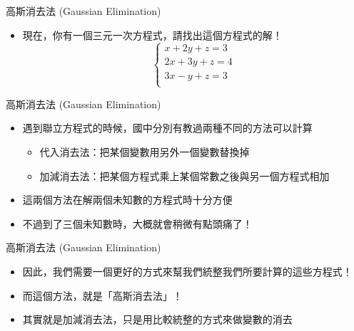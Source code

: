 \documentclass[aspectratio=169]{beamer}
\begin{document}
    \begin{frame}{高斯消去法 (Gaussian Elimination)}
        \begin{itemize}
            \item 現在，你有一個三元一次方程式，請找出這個方程式的解！
            $$\begin{cases}
                x + 2y + z = 3 \\
                2x + 3y + z = 4 \\
                3x - y + z = 3 \\
            \end{cases}$$
        \end{itemize} 
    \end{frame}
    
    \begin{frame}{高斯消去法 (Gaussian Elimination)}
        \begin{itemize}
            \item 遇到聯立方程式的時候，國中分別有教過兩種不同的方法可以計算 
            \begin{itemize}
                \item 代入消去法：把某個變數用另外一個變數替換掉
                \item 加減消去法：把某個方程式乘上某個常數之後與另一個方程式相加
            \end{itemize}
            \item 這兩個方法在解兩個未知數的方程式時十分方便
            \item 不過到了三個未知數時，大概就會稍微有點頭痛了！
        \end{itemize} 
    \end{frame}
    
    \begin{frame}{高斯消去法 (Gaussian Elimination)}
        \begin{itemize}
            \item 因此，我們需要一個更好的方式來幫我們統整我們所要計算的這些方程式！
            \item 而這個方法，就是「高斯消去法」！
            \item 其實就是加減消去法，只是用比較統整的方式來做變數的消去
        \end{itemize} 
    \end{frame}
    
\end{document}
